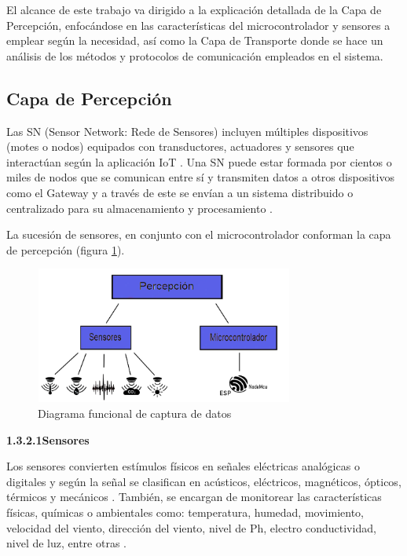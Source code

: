     El alcance de este trabajo va dirigido a la explicación detallada de la Capa de Percepción, enfocándose en las características del microcontrolador y sensores a emplear según la necesidad, así como la Capa de Transporte donde se hace un análisis de los métodos y protocolos de comunicación empleados en el sistema.

    \subsection{Capa de Percepción}\label{subsec:capa_percepcion}

    Las SN (Sensor Network: Rede de Sensores) incluyen múltiples dispositivos (motes o nodos) equipados con transductores, actuadores y sensores que interactúan según la aplicación IoT \cite{hernandez}.
    Una SN puede estar formada por cientos o miles de nodos que se comunican entre sí y transmiten datos a otros dispositivos como el Gateway y a través de este se envían a un sistema distribuido o centralizado para su almacenamiento y procesamiento \cite{hernandez} \cite{lee}.

    La sucesión de sensores, en conjunto con el microcontrolador conforman la capa de percepción (figura \ref{imag:capa_percepcion}). 

    \begin{figure}[H]
        \centering
        \includegraphics[width=8.5cm, height=4.5cm]{imagenes/perception_image.jpg}
        \caption{Diagrama funcional de captura de datos}
        \label{imag:capa_percepcion}
    \end{figure}

    \textbf{1.3.2.1\hspace{5mm}Sensores}
    
    Los sensores convierten estímulos físicos en señales eléctricas analógicas o digitales y según la señal se clasifican en acústicos, eléctricos, magnéticos, ópticos, térmicos y mecánicos \cite{hernandez}.
    También, se encargan de monitorear las características físicas, químicas o ambientales como: temperatura, humedad, movimiento, velocidad del viento, dirección del viento, nivel de Ph, electro conductividad, nivel de luz, entre otras \cite{lee}.

